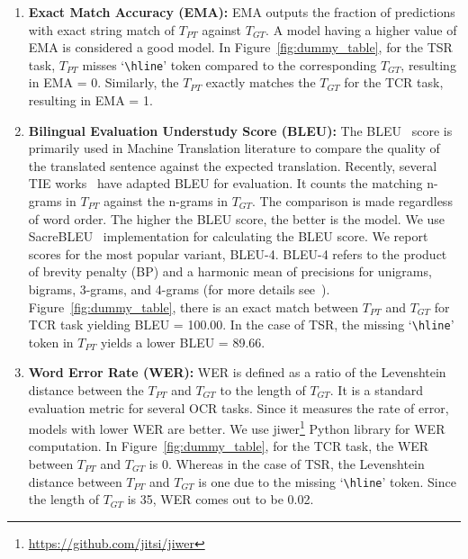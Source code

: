 \documentclass[runningheads]{llncs}
\begin{document}
\begin{enumerate}
    \item \noindent\textbf{Exact Match Accuracy (EMA):} EMA outputs the fraction of predictions with exact string match of $T_{PT}$ against $T_{GT}$. A model having a higher value of EMA is considered a good model. In Figure~\ref{fig:dummy_table}, for the TSR task, $T_{PT}$ misses `\verb+\hline+' token compared to the corresponding $T_{GT}$, resulting in EMA = 0. Similarly, the $T_{PT}$ exactly matches the $T_{GT}$ for the TCR task, resulting in EMA = 1.   
    
    \item \noindent\textbf{Bilingual Evaluation Understudy Score (BLEU):}   
  The BLEU~\cite{bleu} score is primarily used in Machine Translation literature to compare the quality of the translated sentence against the expected translation.  Recently, several TIE works~\cite{Deng2016WhatYG,im2tex} have adapted BLEU for evaluation. It counts the matching n-grams in $T_{PT}$  against the n-grams in $T_{GT}$.  The comparison is made regardless of word order. The higher the BLEU score, the better is the model. We use SacreBLEU~\cite{sacrebleu} implementation for calculating the BLEU score. We report scores for the most popular variant, BLEU-4. BLEU-4 refers to the product of brevity penalty (BP) and a harmonic mean of precisions for unigrams, bigrams, 3-grams, and 4-grams (for more details see~\cite{bleu}). Figure~\ref{fig:dummy_table}, there is an exact match between $T_{PT}$ and $T_{GT}$ for TCR task yielding BLEU = 100.00. In the case of TSR, the missing `\verb+\hline+' token in $T_{PT}$ yields a lower BLEU = 89.66.  
    
    \item \noindent\textbf{Word Error Rate (WER):} WER is defined as a ratio of the Levenshtein distance between the $T_{PT}$ and $T_{GT}$ to the length of $T_{GT}$.  It is a standard evaluation metric for several OCR tasks. Since it measures the rate of error, models with lower WER are better. We use jiwer\footnote{\url{https://github.com/jitsi/jiwer}} Python library for WER computation. In Figure~\ref{fig:dummy_table}, for the TCR task, the WER between $T_{PT}$ and $T_{GT}$ is 0. Whereas in the case of TSR, the Levenshtein distance between $T_{PT}$ and $T_{GT}$ is one due to the missing `\verb+\hline+' token. Since the length of $T_{GT}$ is 35, WER comes out to be 0.02. 

\end{enumerate}
\end{document}
